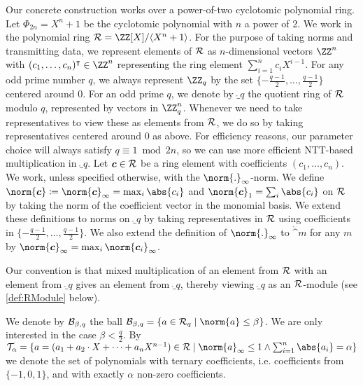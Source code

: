 Our concrete construction works over a power-of-two cyclotomic polynomial ring.
Let $\Phi_{2n} = X^n+1$ be the cyclotomic polynomial with $n$ a power of 2. 
We work in the polynomial ring $\ring =  \defring$. For the purpose of taking norms and transmitting data, we represent elements of $\mathcal{R}$ as $n$-dimensional vectors $\ZZ^n$ with $(c_1,\dots,c_{n})^\transpose\in \ZZ^n$ representing the ring element $\sum_{i=1}^{n} c_{i} X^{i-1}$.
For any odd prime number $q$, we always represent $\ZZ_q$ by the set $\{-\tfrac{q-1}{2},\ldots,\tfrac{q-1}{2}\}$ centered around 0.
For an odd prime $q$, we denote by $\ring_q$ the quotient ring of $\mathcal{R}$ modulo $q$, represented by vectors in $\ZZ_q^n$. Whenever we need to take representatives to view these as elements from $\mathcal{R}$, we do so by taking representatives centered around 0 as above. For efficiency reasons, our parameter choice will always satisfy $q \equiv 1 \bmod 2n$, so we can use more efficient NTT-based multiplication in $\ring_q$.
Let $\boldsymbol{c} \in \mathcal{R}$ be a ring element with coefficients $(c_1,\ldots, c_{n})$.
We work, unless specified otherwise, with the $\norm{.}_\infty$-norm.
We define $\norm{\vec{c}}\coloneqq\norm{\vec{c}}_\infty = \max_{i}\abs{c_i}$ and $\norm{\vec{c}}_1 = \sum_{i}\abs{c_i}$ on $\mathcal{R}$ by taking the norm of the coefficient vector in the monomial basis.
We extend these definitions to norms on $\ring_q$ by taking representatives in $\mathcal{R}$ using coefficients in $\{-\tfrac{q-1}{2},\ldots,\tfrac{q-1}{2}\}$.
We also extend the definition of $\norm{.}_\infty$ to $\ring^m$ for any $m$ by $\norm{\vec{c}}_{\infty}= \max_i\norm{\vec{c}_i}_\infty$.

Our convention is that mixed multiplication of an element from $\mathcal{R}$ with an element from $\ring_q$ gives an element from $\ring_q$, thereby viewing $\ring_q$ as an $\mathcal{R}$-module (see \autoref{def:RModule} below).

We denote by $\mathcal{B}_{\beta, q}$ the ball $\ball{\beta}{q} = \{a\in\ring_q\mid \norm{a}\leq\beta\}$. We are only interested in the case $\beta < \tfrac{q}{2}$.
By 
\(
\tern_\alpha = \{a=(a_1+a_2\cdot X + \dots + a_{n}X^{n-1}) \in\ring \mid \norm{a}_\infty\leq 1 \land \sum_{i=1}^{n} \abs{a_i} = \alpha\}
\) %
we denote the set of polynomials with ternary coefficients, i.e. coefficients from $\{-1,0,1\}$, and with exactly $\alpha$ non-zero coefficients.


